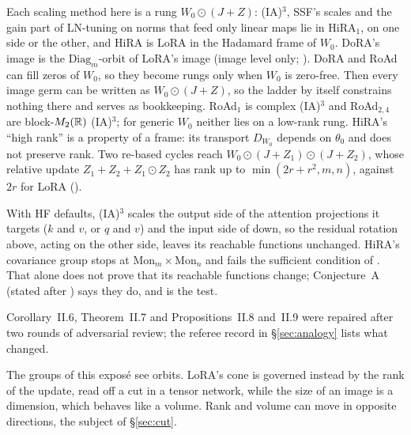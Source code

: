 \begin{explains}
Each scaling method here is a rung $W_0\odot(J+Z)$: (IA)$^3$, SSF's scales and the gain part of LN-tuning on norms that
feed only linear maps lie in $\mathrm{HiRA}_1$, on one side or the other, and HiRA is LoRA in the Hadamard frame of
$W_0$. DoRA's image is the $\mathrm{Diag}_m$-orbit of LoRA's image (image level only; ). DoRA
and RoAd can fill zeros of $W_0$, so they become rungs only when $W_0$ is zero-free. Then every image germ can be written
as $W_0\odot(J+Z)$, so the ladder by itself constrains nothing there and serves as bookkeeping. RoAd$_1$ is complex
(IA)$^3$ and RoAd$_{2,4}$ are block-$M_2(\mathbb{R})$ (IA)$^3$; for generic $W_0$ neither lies on a low-rank rung. HiRA's ``high
rank'' is a property of a frame: its transport $D_{W_0}$ depends on $\theta_0$ and does not preserve rank. Two re-based
cycles reach $W_0\odot(J+Z_1)\odot(J+Z_2)$, whose relative update $Z_1+Z_2+Z_1\odot Z_2$ has rank up to
$\min(2r+r^2,m,n)$, against $2r$ for LoRA ().
\end{explains}

With HF defaults, (IA)$^3$ scales the output side of the attention projections it targets ($k$ and $v$, or $q$ and $v$)
and the input side of down, so the residual rotation above, acting on the other side, leaves its reachable functions
unchanged. HiRA's covariance group stops at $\mathrm{Mon}_m\times\mathrm{Mon}_n$ and fails the sufficient condition of
. That alone does not prove that its reachable functions change; Conjecture~A (stated after
) says they do, and  is the test.

Corollary~II.6, Theorem~II.7 and Propositions~II.8 and~II.9 were repaired after two rounds of adversarial review; the
referee record in \S\ref{sec:analogy} lists what changed.

The groups of this exposé see orbits. LoRA's cone is governed instead by the rank of the update, read off a cut in a
tensor network, while the size of an image is a dimension, which behaves like a volume. Rank and volume can move in
opposite directions, the subject of \S\ref{sec:cut}.
